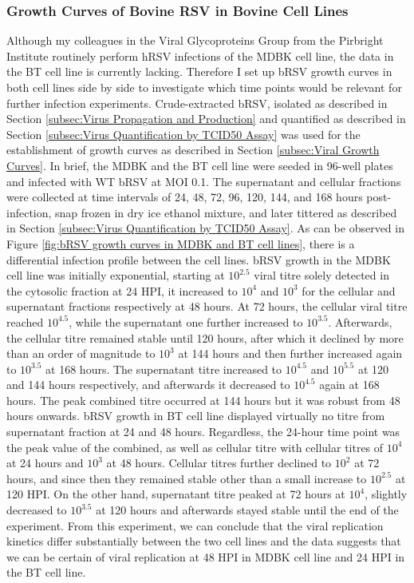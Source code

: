 \subsubsection{Growth Curves of Bovine RSV in Bovine Cell Lines} \label{Growth Curves of Bovine RSV in Bovine Cell Lines}
Although my colleagues in the Viral Glycoproteins Group from the Pirbright Institute routinely perform hRSV infections of the MDBK cell line, the data in the BT cell line is currently lacking. Therefore I set up bRSV growth curves in both cell lines side by side to investigate which time points would be relevant for further infection experiments. Crude-extracted bRSV, isolated as described in Section \ref{subsec:Virus Propagation and Production} and quantified as described in Section \ref{subsec:Virus Quantification by TCID50 Assay} was used for the establishment of growth curves as described in Section \ref{subsec:Viral Growth Curves}. In brief, the MDBK and the BT cell line were seeded in 96-well plates and infected with WT bRSV at MOI 0.1. The supernatant and cellular fractions were collected at time intervals of 24, 48, 72, 96, 120, 144, and 168 hours post-infection, snap frozen in dry ice ethanol mixture, and later tittered as described in Section \ref{subsec:Virus Quantification by TCID50 Assay}. As can be observed in Figure \ref{fig:bRSV growth curves in MDBK and BT cell lines}, there is a differential infection profile between the cell lines. bRSV growth in the MDBK cell line was initially exponential, starting at \(10^{2.5}\) viral titre solely detected in the cytosolic fraction at 24 HPI, it increased to \(10^{4}\) and \(10^{3}\) for the cellular and supernatant fractions respectively at 48 hours. At 72 hours, the cellular viral titre reached \(10^{4.5}\), while the supernatant one further increased to \(10^{3.5}\). Afterwards, the cellular titre remained stable until 120 hours, after which it declined by more than an order of magnitude to \(10^{3}\) at 144 hours and then further increased again to \(10^{3.5}\) at 168 hours. The supernatant titre increased to \(10^{4.5}\) and \(10^{5.5}\) at 120 and 144 hours respectively, and afterwards it decreased to \(10^{4.5}\) again at 168 hours. The peak combined titre occurred at 144 hours but it was robust from 48 hours onwards. bRSV growth in BT cell line displayed virtually no titre from supernatant fraction at 24 and 48 hours. Regardless, the 24-hour time point was the peak value of the combined, as well as cellular titre with cellular titres of \(10^{4}\) at 24 hours and \(10^{3}\) at 48 hours. Cellular titres further declined to \(10^{2}\) at 72 hours, and since then they remained stable other than a small increase to \(10^{2.5}\) at 120 HPI. On the other hand, supernatant titre peaked at 72 hours at \(10^{4}\), slightly decreased to \(10^{3.5}\) at 120 hours and afterwards stayed stable until the end of the experiment. From this experiment, we can conclude that the viral replication kinetics differ substantially between the two cell lines and the data suggests that we can be certain of viral replication at 48 HPI in MDBK cell line and 24 HPI in the BT cell line.

